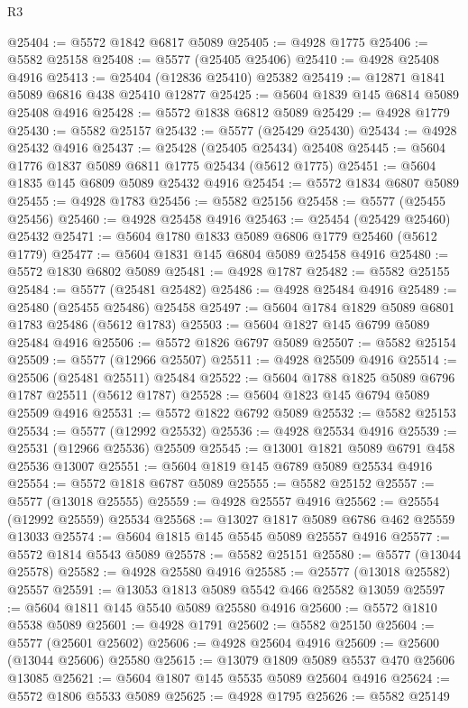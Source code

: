 \begin{lexlean}{R3}
\begin{coremodule}
@25404 := @5572 @1842 @6817 @5089
@25405 := @4928 @1775
@25406 := @5582 @25158
@25408 := @5577 (@25405 @25406)
@25410 := @4928 @25408 @4916
@25413 := @25404 (@12836 @25410) @25382
@25419 := @12871 @1841 @5089 @6816 @438 @25410 @12877
@25425 := @5604 @1839 @145 @6814 @5089 @25408 @4916
@25428 := @5572 @1838 @6812 @5089
@25429 := @4928 @1779
@25430 := @5582 @25157
@25432 := @5577 (@25429 @25430)
@25434 := @4928 @25432 @4916
@25437 := @25428 (@25405 @25434) @25408
@25445 := @5604 @1776 @1837 @5089 @6811 @1775 @25434 (@5612 @1775)
@25451 := @5604 @1835 @145 @6809 @5089 @25432 @4916
@25454 := @5572 @1834 @6807 @5089
@25455 := @4928 @1783
@25456 := @5582 @25156
@25458 := @5577 (@25455 @25456)
@25460 := @4928 @25458 @4916
@25463 := @25454 (@25429 @25460) @25432
@25471 := @5604 @1780 @1833 @5089 @6806 @1779 @25460 (@5612 @1779)
@25477 := @5604 @1831 @145 @6804 @5089 @25458 @4916
@25480 := @5572 @1830 @6802 @5089
@25481 := @4928 @1787
@25482 := @5582 @25155
@25484 := @5577 (@25481 @25482)
@25486 := @4928 @25484 @4916
@25489 := @25480 (@25455 @25486) @25458
@25497 := @5604 @1784 @1829 @5089 @6801 @1783 @25486 (@5612 @1783)
@25503 := @5604 @1827 @145 @6799 @5089 @25484 @4916
@25506 := @5572 @1826 @6797 @5089
@25507 := @5582 @25154
@25509 := @5577 (@12966 @25507)
@25511 := @4928 @25509 @4916
@25514 := @25506 (@25481 @25511) @25484
@25522 := @5604 @1788 @1825 @5089 @6796 @1787 @25511 (@5612 @1787)
@25528 := @5604 @1823 @145 @6794 @5089 @25509 @4916
@25531 := @5572 @1822 @6792 @5089
@25532 := @5582 @25153
@25534 := @5577 (@12992 @25532)
@25536 := @4928 @25534 @4916
@25539 := @25531 (@12966 @25536) @25509
@25545 := @13001 @1821 @5089 @6791 @458 @25536 @13007
@25551 := @5604 @1819 @145 @6789 @5089 @25534 @4916
@25554 := @5572 @1818 @6787 @5089
@25555 := @5582 @25152
@25557 := @5577 (@13018 @25555)
@25559 := @4928 @25557 @4916
@25562 := @25554 (@12992 @25559) @25534
@25568 := @13027 @1817 @5089 @6786 @462 @25559 @13033
@25574 := @5604 @1815 @145 @5545 @5089 @25557 @4916
@25577 := @5572 @1814 @5543 @5089
@25578 := @5582 @25151
@25580 := @5577 (@13044 @25578)
@25582 := @4928 @25580 @4916
@25585 := @25577 (@13018 @25582) @25557
@25591 := @13053 @1813 @5089 @5542 @466 @25582 @13059
@25597 := @5604 @1811 @145 @5540 @5089 @25580 @4916
@25600 := @5572 @1810 @5538 @5089
@25601 := @4928 @1791
@25602 := @5582 @25150
@25604 := @5577 (@25601 @25602)
@25606 := @4928 @25604 @4916
@25609 := @25600 (@13044 @25606) @25580
@25615 := @13079 @1809 @5089 @5537 @470 @25606 @13085
@25621 := @5604 @1807 @145 @5535 @5089 @25604 @4916
@25624 := @5572 @1806 @5533 @5089
@25625 := @4928 @1795
@25626 := @5582 @25149

\end{coremodule}
\end{lexlean}
